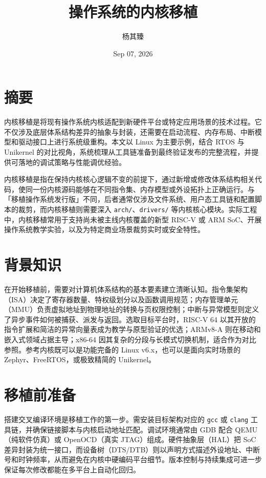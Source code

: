 \title{操作系统的内核移植}
\author{杨其臻}
\date{Sep 07, 2026}
\maketitle
\chapter{摘要}
内核移植是将现有操作系统内核适配到新硬件平台或特定应用场景的技术过程。它不仅涉及底层体系结构差异的抽象与封装，还需要在启动流程、内存布局、中断模型和驱动接口上进行系统级重构。本文以 Linux 为主要示例，结合 RTOS 与 Unikernel 的对比视角，系统梳理从工具链准备到最终验证发布的完整流程，并提供可落地的调试策略与性能调优经验。\par
内核移植是指在保持内核核心逻辑不变的前提下，通过新增或修改体系结构相关代码，使同一份内核源码能够在不同指令集、内存模型或外设拓扑上正确运行。与「移植操作系统发行版」不同，后者通常仅涉及文件系统、用户态工具链和配置脚本的裁剪，而内核移植则需要深入 \texttt{arch/}、\texttt{drivers/} 等内核核心模块。实际工程中，内核移植常用于支持尚未被主线内核覆盖的新型 RISC-V 或 ARM SoC、开展操作系统教学实验，以及为特定商业场景裁剪实时或安全特性。\par
\chapter{背景知识}
在开始移植前，需要对计算机体系结构的基本要素建立清晰认知。指令集架构（ISA）决定了寄存器数量、特权级划分以及函数调用规范；内存管理单元（MMU）负责虚拟地址到物理地址的转换与页权限控制；中断与异常模型则定义了异步事件如何被捕获、派发与返回。选取目标平台时，RISC-V 64 以其开放的指令扩展和简洁的异常向量表成为教学与原型验证的优选；ARMv8-A 则在移动和嵌入式领域占据主导；x86-64 因其复杂的分段与长模式切换机制，适合作为对比参照。参考内核既可以是功能完备的 Linux v6.x，也可以是面向实时场景的 Zephyr、FreeRTOS，或极致精简的 Unikernel。\par
\chapter{移植前准备}
搭建交叉编译环境是移植工作的第一步。需安装目标架构对应的 \texttt{gcc} 或 \texttt{clang} 工具链，并确保链接脚本与内核启动地址匹配。调试环境通常由 GDB 配合 QEMU（纯软件仿真）或 OpenOCD（真实 JTAG）组成。硬件抽象层（HAL）把 SoC 差异封装为统一接口，而设备树（DTS/DTB）则以声明方式描述外设地址、中断号和时钟频率，从而避免在内核中硬编码平台细节。版本控制与持续集成可进一步保证每次修改都能在多平台上自动化回归。\par
